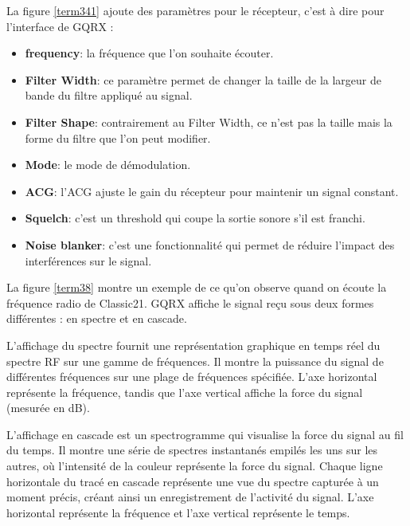 \vspace{0.1cm}

La figure \ref{term341} ajoute des paramètres pour le récepteur, c'est à dire pour l'interface de GQRX :

\vspace{0.1cm}

\begin{itemize}
\item \textbf{frequency}: la fréquence que l'on souhaite écouter.
\item \textbf{Filter Width}: ce paramètre permet de changer la taille de la largeur de bande du filtre appliqué au signal.
\item \textbf{Filter Shape}: contrairement au Filter Width, ce n'est pas la taille mais la forme du filtre que l'on peut modifier.
\item \textbf{Mode}: le mode de démodulation.
\item \textbf{\ac{ACG}}: l'\ac{ACG} ajuste le gain du récepteur pour maintenir un signal constant.
\item \textbf{Squelch}: c'est un threshold qui coupe la sortie sonore s'il est franchi.
\item \textbf{Noise blanker}: c'est une fonctionnalité qui permet de réduire l'impact des interférences sur le signal.
\end{itemize}

\vspace{0.1cm}

La figure \ref{term38} montre un exemple de ce qu'on observe quand on écoute la fréquence radio de Classic21. GQRX affiche le signal reçu sous deux formes différentes : en spectre et en cascade.

\vspace{0.1cm}

L'affichage du spectre fournit une représentation graphique en temps réel du spectre RF sur une gamme de fréquences.
Il montre la puissance du signal de différentes fréquences sur une plage de fréquences spécifiée.
L'axe horizontal représente la fréquence, tandis que l'axe vertical affiche la force du signal (mesurée en dB).

\vspace{0.1cm}

L'affichage en cascade est un spectrogramme qui visualise la force du signal au fil du temps.
Il montre une série de spectres instantanés empilés les uns sur les autres, où l'intensité de la couleur représente la force du signal.
Chaque ligne horizontale du tracé en cascade représente une vue du spectre capturée à un moment précis, créant ainsi un enregistrement de l'activité du signal.
L'axe horizontal représente la fréquence et l'axe vertical représente le temps.

